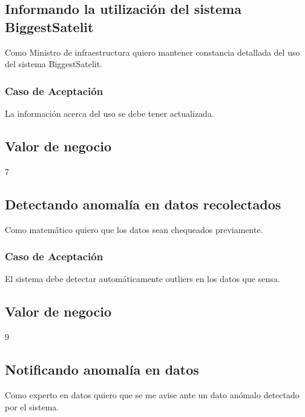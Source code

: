 \linea \subsection*{Informando la utilización del sistema BiggestSatelit}
Como Ministro de infraestructura quiero mantener constancia detallada del uso del sistema BiggestSatelit.
\subsubsection*{Caso de Aceptación}
La información acerca del uso se debe tener actualizada.
\subsection*{Valor de negocio}
7


\linea \subsection*{Detectando anomalía en datos recolectados}
Como matemático quiero que los datos sean chequeados previamente.
\subsubsection*{Caso de Aceptación}
El sistema debe detectar automáticamente outliers en los datos que sensa.
\subsection*{Valor de negocio}
9


\linea \subsection*{Notificando anomalía en datos}
Como experto en datos quiero que se me avise ante un dato anómalo detectado por el sistema.

